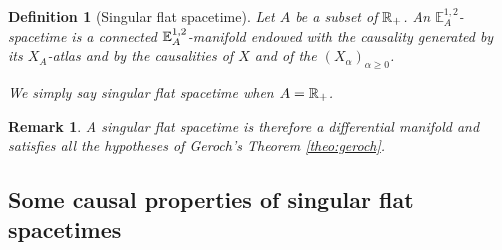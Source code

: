 \documentclass[a4paper,twoside]{article}
\newcommand{\mass}[1]{\mathbb{E}^{1,2}_{#1}}
\newtheorem{defi}[lem]{Definition}
\newtheorem{rem}[lem]{Remark}
\begin{document}
\begin{defi}[Singular flat spacetime]\label{def:singular_spacetime}
Let $A$ be a subset of $\mathbb R_+$.
An $\mass{A}$-spacetime is a connected $\mathbb{E}^{1,2}_A$-manifold endowed with the causality generated
by its $X_A$-atlas and by the causalities of $X$ and of the
$(X_\alpha)_{\alpha\geq 0}$.

We simply say singular flat spacetime when $A=\mathbb R_+$.
\end{defi}
\begin{rem}\label{rem:singular_flat_spacetime_therefore}
A singular flat spacetime is therefore a differential manifold and satisfies all the
hypotheses of Geroch's Theorem \ref{theo:geroch}.
\end{rem}

\subsection{Some causal properties of singular flat spacetimes}
\end{document}
